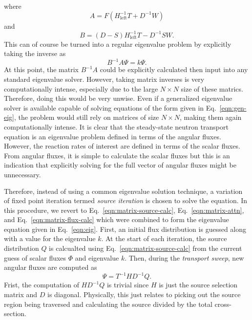 where
\begin{equation}
A = F \left(H_{\text{left}}^{-1} T + D^{-1} W \right)
\end{equation}
and
\begin{equation}
B = \left(D-S\right) H_{\text{left}}^{-1} T -  D^{-1} S W.
\end{equation}
This can of course be turned into a regular eigenvalue problem by explicitly taking the inverse as
\begin{equation}
B^{-1}A \Psi = k \Psi.
\label{eqn:eig}
\end{equation}
At this point, the matrix $B^{-1}A$ could be explicitly calculated then input into any standard eigenvalue solver. However, taking matrix inverses is very computationally intense, especially due to the large $N \times N$ size of these matrics. Therefore, doing this would be very unwise. Even if a generalized eigenvalue solver is available capable of solving equations of the form given in Eq.~\ref{eqn:gen-eig}, the problem would still rely on matrices of size $N \times N$, making them again computationally intense. It is clear that the steady-state neutron transport equation is an eigenvalue problem defined in terms of the angular fluxes. However, the reaction rates of interest are defined in terms of the scalar fluxes. From angular fluxes, it is simple to calculate the scalar fluxes but this is an indication that explicitly solving for the full vector of angular fluxes might be unnecessary.

Therefore, instead of using a common eigenvalue solution technique, a variation of fixed point iteration termed \textit{source iteration} is chosen to solve the equation. In this procedure, we revert to Eq.~\ref{eqn:matrix-source-calc}, Eq.~\ref{eqn:matrix-attn}, and Eq.~\ref{eqn:matrix-flux-calc} which were combined to form the eigenvalue equation given in Eq.~\ref{eqn:eig}. First, an initial flux distribution is guessed along with a value for the eigenvalue $k$. At the start of each iteration, the source distribution $Q$ is calcualted using Eq.~\ref{eqn:matrix-source-calc} from the current guess of scalar fluxes $\Phi$ and eigenvalue $k$. Then, during the \textit{transport sweep}, new angular fluxes are computed as
\begin{equation}
\Psi = T^{-1} H D^{-1} Q.
\end{equation}
Frist, the computation of $HD^{-1}Q$ is trivial since $H$ is just the source selection matrix and $D$ is diagonal. Physically, this just relates to picking out the source region being traversed and calculating the source divided by the total cross-section.

